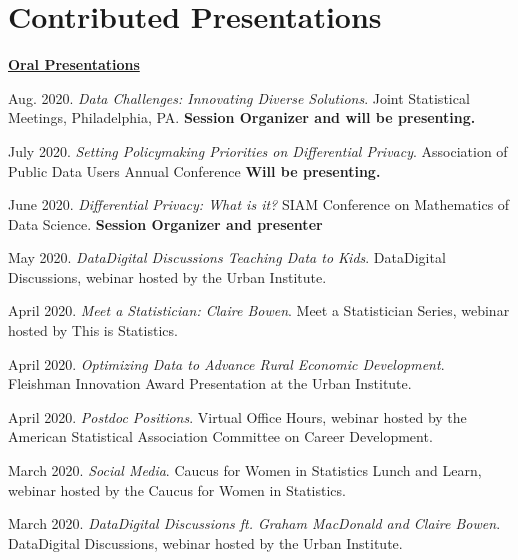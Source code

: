 \documentclass[11pt, letterpaper, roman]{moderncv} %
\begin{document}
\vspace{-10pt}
\section{Contributed Presentations}

\underline{\textbf{\large Oral Presentations}}\normalsize
\begin{etaremune}[topsep=0pt, itemsep=6pt, partopsep=0pt, parsep=0pt]
  \item Aug. 2020. \textit{Data Challenges: Innovating Diverse Solutions}. Joint Statistical Meetings, Philadelphia, PA. \textbf{Session Organizer and will be presenting.}
  
  \item July 2020. \textit{Setting Policymaking Priorities on Differential Privacy}. Association of Public Data Users Annual Conference \textbf{Will be presenting.}

  \item June 2020. \textit{Differential Privacy: What is it?} SIAM Conference on Mathematics of Data Science. \textbf{Session Organizer and presenter}
  
    \item May 2020. \textit{Data\@Urban Digital Discussions Teaching Data to Kids}. Data\@Urban Digital Discussions, webinar hosted by the Urban Institute.
  
  \item April 2020. \textit{Meet a Statistician: Claire Bowen}. Meet a Statistician Series, webinar hosted by This is Statistics.
  
  \item April 2020. \textit{Optimizing Data to Advance Rural Economic Development}. Fleishman Innovation Award Presentation at the Urban Institute.
  
  \item April 2020. \textit{Postdoc Positions}. Virtual Office Hours, webinar hosted by the American Statistical Association Committee on Career Development.
  
  \item March 2020. \textit{Social Media}. Caucus for Women in Statistics Lunch and Learn, webinar hosted by the Caucus for Women in Statistics.

  \item March 2020. \textit{Data\@Urban Digital Discussions ft. Graham MacDonald and Claire Bowen}. Data\@Urban Digital Discussions, webinar hosted by the Urban Institute.
  

\end{etaremune}
\end{document}
